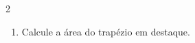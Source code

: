 \documentclass[a4paper,14pt]{article}
\begin{document}
\begin{multicols}{2}
\begin{enumerate}
\begin{enumerate}[a)]
            	\item $y = -2$ \\\\\\\\\\\\\\\\\\\\\\\\\\\\
            	\item $x - 1 = 0$ \\\\\\\\\\\\\\\\\\
            	\item $7x + 3y - 2 = 0$ \\\\\\\\\\\\\\\\\\\\\\\\
            \end{enumerate}
            \item Calcule a área do trapézio em destaque.\\

\end{enumerate}
\end{multicols}
\end{document}
